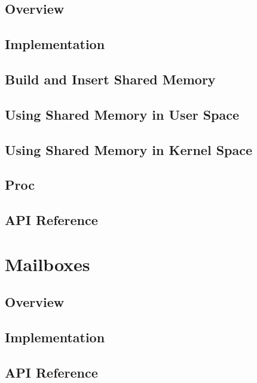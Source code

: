\subsection{Overview}

\subsection{Implementation}

\subsection{Build and Insert Shared Memory}

\subsection{Using Shared Memory in User Space}

\subsection{Using Shared Memory in Kernel Space}

\subsection{Proc}

\subsection{API Reference}


\section{Mailboxes}

\subsection{Overview}

\subsection{Implementation}

\subsection{API Reference}

